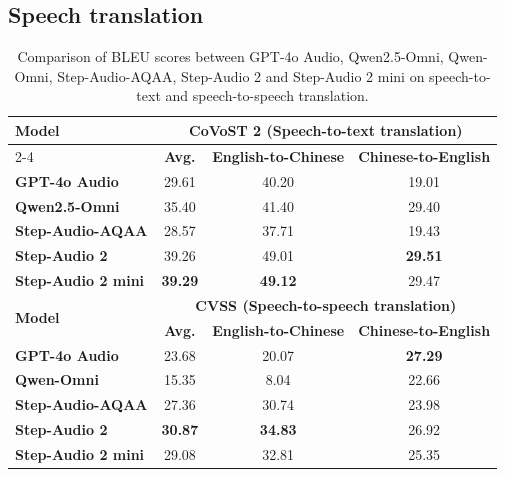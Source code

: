\subsection{Speech translation}
\begin{table}[h]
\caption{Comparison of BLEU scores between GPT-4o Audio, Qwen2.5-Omni, Qwen-Omni, Step-Audio-AQAA, Step-Audio 2 and Step-Audio 2 mini on speech-to-text and speech-to-speech translation.}
\label{tab:S2ST-7b}
\centering
\begin{tabular}{lccc}
\toprule
\multirow{2}{*}{\textbf{Model}}&\multicolumn{3}{c}{\textbf{CoVoST 2 (Speech-to-text translation)}}\\
\cmidrule(lr){2-4}
& \textbf{Avg.} & \textbf{English-to-Chinese}& \textbf{Chinese-to-English}\\
\midrule
\textbf{GPT-4o Audio}       &29.61& 40.20 & 19.01 \\
\textbf{Qwen2.5-Omni}       &35.40& 41.40 & 29.40 \\
\textbf{Step-Audio-AQAA}    &28.57& 37.71 & 19.43 \\
\textbf{Step-Audio 2} &39.26& 49.01 & \textbf{29.51} \\
\textbf{Step-Audio 2 mini}  &\textbf{39.29}& \textbf{49.12} & 29.47 \\
\midrule
\multirow{2}{*}{\textbf{Model}}&\multicolumn{3}{c}{\textbf{CVSS (Speech-to-speech translation)}}\\
\cmidrule(lr){2-4}
&\textbf{Avg.} & \textbf{English-to-Chinese} & \textbf{Chinese-to-English} \\
\midrule
\textbf{GPT-4o Audio}       &23.68& 20.07 & \textbf{27.29} \\
\textbf{Qwen-Omni}          &15.35& 8.04  & 22.66 \\
\textbf{Step-Audio-AQAA}    &27.36& 30.74 & 23.98 \\
\textbf{Step-Audio 2} &\textbf{30.87}& \textbf{34.83} & 26.92 \\
\textbf{Step-Audio 2 mini}  &29.08& 32.81 & 25.35 \\
\bottomrule
\end{tabular}
\end{table}


